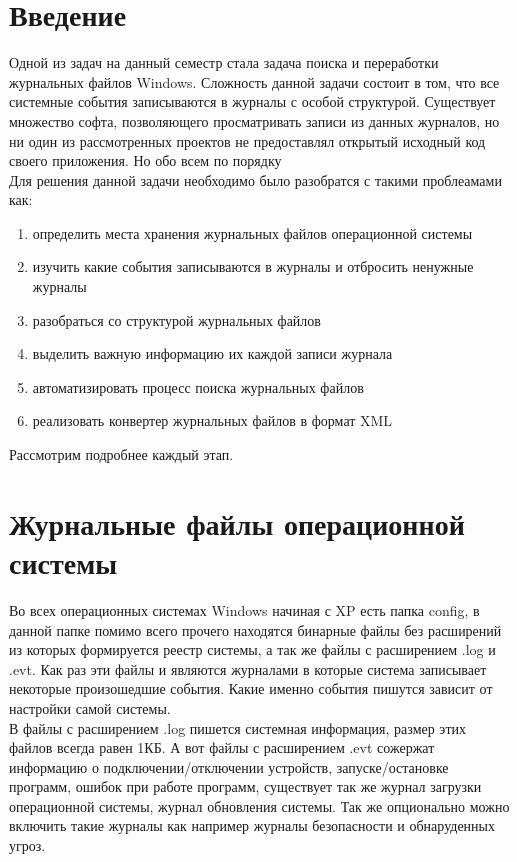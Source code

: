 \newpage

\chapter*{Введение}

Одной из задач на данный семестр стала задача поиска и переработки журнальных файлов Windows. Сложность данной задачи состоит в том, что все системные события записываются в журналы с особой структурой. Существует множество софта, позволяющего просматривать записи из данных журналов, но ни один из рассмотренных проектов не предоставлял открытый исходный код своего приложения. Но обо всем по порядку \\
Для решения данной задачи необходимо было разобратся с такими проблеамами как: \\

\begin{enumerate}
\item определить места хранения журнальных файлов операционной системы
\item изучить какие события записываются в журналы и отбросить ненужные журналы
\item разобраться со структурой журнальных файлов
\item выделить важную информацию их каждой записи журнала
\item автоматизировать процесс поиска журнальных файлов
\item реализовать конвертер журнальных файлов в формат XML
\end{enumerate}

Рассмотрим подробнее каждый этап. \\

\chapter*{Журнальные файлы операционной системы}

Во всех операционных системах Windows начиная с XP есть папка config, в данной папке помимо всего прочего находятся бинарные файлы без расширений из которых формируется реестр системы, а так же файлы с расширением .log и .evt. Как раз эти файлы и являются журналами в которые система записывает некоторые произошедшие события. Какие именно события пишутся зависит от настройки самой системы. \\

В файлы с расширением .log пишется системная информация, размер этих файлов всегда равен 1КБ. А вот файлы с расширением .evt сожержат информацию о подключении/отключении устройств, запуске/остановке программ, ошибок при работе программ, существует так же журнал загрузки операционной системы, журнал обновления системы. Так же опционально можно включить такие журналы как например журналы безопасности и обнаруденных угроз. \\

